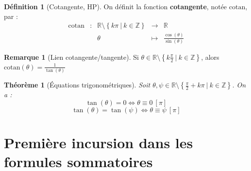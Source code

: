 \documentclass[french]{book}
\newcommand{\Z}{\mathbb{Z}}
\newcommand{\R}{\mathbb{R}}
\theoremstyle{plain}
\newtheorem{thm}{Théorème}[chapter]
\theoremstyle{definition}
\newtheorem{dfn}{Définition}[chapter]
\newtheorem{rmq}{Remarque}[chapter]
\theoremstyle{remark}
\begin{document}
\begin{dfn}[Cotangente, HP]
	On définit la fonction \textbf{cotangente}, notée $\text{cotan}$, par : $$\begin{array}{ccccc}\text{cotan}&:&\R\setminus\left\{k\pi\ | \ k\in\Z\right\}&\rightarrow&\R\\&&\theta&\mapsto&\displaystyle\frac{\cos(\theta)}{\sin(\theta)}\end{array}$$
\end{dfn}
\begin{rmq}[Lien cotangente/tangente]
	Si $\theta\in\R\setminus\left\{\displaystyle k\frac{\pi}{2}\ | \ k\in\Z\right\}$, alors $\displaystyle\text{cotan}(\theta)=\frac{1}{\tan(\theta)}$
\end{rmq}
\begin{thm}[Équations trigonométriques]
	Soit $\theta,\psi\in\R\setminus\left\{\displaystyle\frac{\pi}{2}+k\pi\ | \ k\in\Z\right\}$. On a : $$\tan(\theta)=0\iff \theta\equiv0\ [\pi]$$ $$\tan(\theta)=\tan(\psi)\iff \theta\equiv\psi\ [\pi]$$
\end{thm}
\section{Première incursion dans les formules sommatoires}
\end{document}
